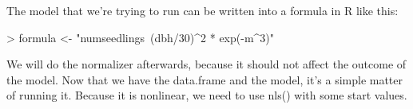 \documentclass{article}
\begin{document}
The model that we're trying to run can be written into a formula in R like this:

\begin{Schunk}
\begin{Sinput}
> formula <- "numseedlings~(dbh/30)^2 * exp(-m^3)"
\end{Sinput}
\end{Schunk}

We will do the normalizer afterwards, because it should not affect the outcome of the model. Now that we have the data.frame and the model, it's a simple matter of running it. Because it is nonlinear, we need to use nls() with some start values.




\end{document}
